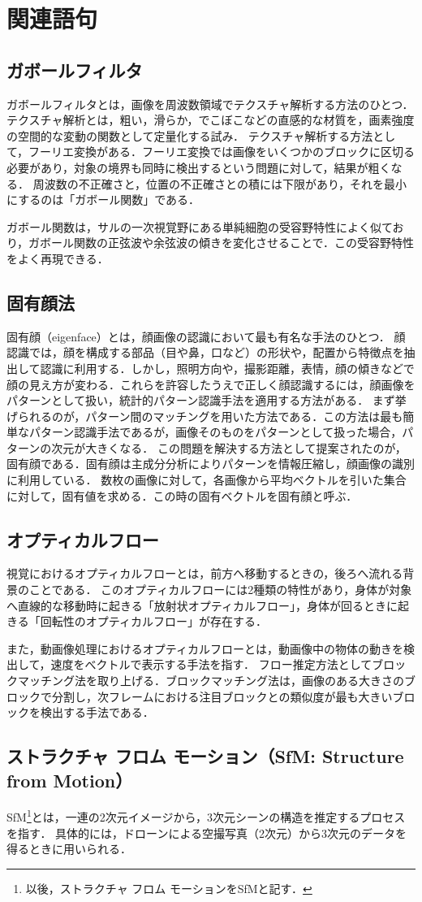 \chapter{関連語句}
\section{ガボールフィルタ}
ガボールフィルタとは，画像を周波数領域でテクスチャ解析する方法のひとつ．
テクスチャ解析とは，粗い，滑らか，でこぼこなどの直感的な材質を，画素強度の空間的な変動の関数として定量化する試み\cite{テクスチャ解析}．
テクスチャ解析する方法として，フーリエ変換がある．フーリエ変換では画像をいくつかのブロックに区切る必要があり，対象の境界も同時に検出するという問題に対して，結果が粗くなる．
周波数の不正確さと，位置の不正確さとの積には下限があり，それを最小にするのは「ガボール関数」である．\par
ガボール関数は，サルの一次視覚野にある単純細胞の受容野特性によく似ており，ガボール関数の正弦波や余弦波の傾きを変化させることで．この受容野特性をよく再現できる．
\begin{flushright}
    \cite[p.144]{認知心理学辞典}
\end{flushright}
\section{固有顔法}
固有顔（eigenface）とは，顔画像の認識において最も有名な手法のひとつ．
顔認識では，顔を構成する部品（目や鼻，口など）の形状や，配置から特徴点を抽出して認識に利用する．しかし，照明方向や，撮影距離，表情，顔の傾きなどで顔の見え方が変わる．これらを許容したうえで正しく顔認識するには，顔画像をパターンとして扱い，統計的パターン認識手法を適用する方法がある．
まず挙げられるのが，パターン間のマッチングを用いた方法である．この方法は最も簡単なパターン認識手法であるが，画像そのものをパターンとして扱った場合，パターンの次元が大きくなる．
この問題を解決する方法として提案されたのが，固有顔である．固有顔は主成分分析によりパターンを情報圧縮し，顔画像の識別に利用している．
数枚の画像に対して，各画像から平均ベクトルを引いた集合に対して，固有値を求める．この時の固有ベクトルを固有顔と呼ぶ．\par
\hfill\cite{顔画像からの個人識別}
\section{オプティカルフロー}
視覚におけるオプティカルフローとは，前方へ移動するときの，後ろへ流れる背景のことである．
このオプティカルフローには2種類の特性があり，身体が対象へ直線的な移動時に起きる「放射状オプティカルフロー」，身体が回るときに起きる「回転性のオプティカルフロー」が存在する\cite[p.679]{人間の運動学}．\par
また，動画像処理におけるオプティカルフローとは，動画像中の物体の動きを検出して，速度をべクトルで表示する手法を指す．
フロー推定方法としてブロックマッチング法を取り上げる．ブロックマッチング法は，画像のある大きさのブロックで分割し，次フレームにおける注目ブロックとの類似度が最も大きいブロックを検出する手法である\cite{オプティカルフローを用いた画像中の野鳥検出}．
\section{ストラクチャ フロム モーション（SfM: Structure from Motion）}
SfM\footnote{以後，ストラクチャ フロム モーションをSfMと記す．}とは，一連の2次元イメージから，3次元シーンの構造を推定するプロセスを指す\cite{SfM}．
具体的には，ドローンによる空撮写真（2次元）から3次元のデータを得るときに用いられる．

